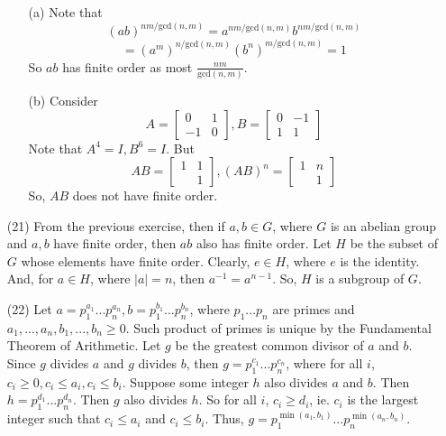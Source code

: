 \documentclass[12pt]{article}
\begin{document}
\begin{itemize}
\begin{itemize}
\item[(a)]
Note that 
$$(ab)^{nm/\text{gcd}(n,m)} = a^{nm/\text{gcd}(n,m)}b^{nm/\text{gcd}(n,m)}$$
$$= (a^m)^{n/\text{gcd}(n,m)}(b^n)^{m/\text{gcd}(n,m)} = 1$$ So $ab$ has finite order as most $\frac{nm}{\text{gcd}(n,m)}$. 
\item[(b)]
Consider
$$A = \begin{bmatrix}
0 & 1 \\
-1 & 0
\end{bmatrix}, B = \begin{bmatrix}
0 & -1 \\
1 & 1
\end{bmatrix}$$
Note that $A^4 = I, B^6 = I$. But
$$AB = \begin{bmatrix}
1 & 1 \\
& 1
\end{bmatrix}, (AB)^n = \begin{bmatrix}
1 & n \\
& 1
\end{bmatrix}$$
So, $AB$ does not have finite order.
\end{itemize}
\item[(21)]
From the previous exercise, then if $a, b \in G$, where $G$ is an abelian group and $a, b$ have finite order, then $ab$ also has finite order. Let $H$ be the subset of $G$ whose elements have finite order. Clearly, $e \in H$, where $e$ is the identity. And, for $a \in H$, where $|a| = n$, then $a^{-1} = a^{n-1}$. So, $H$ is a subgroup of $G$.
\item[(22)]
Let $a = p_1^{a_1}...p_n^{a_n}, b = p_1^{b_1}...p_n^{b_n}$, where $p_1...p_n$ are primes and $a_1, ..., a_n, b_1, ..., b_n \geq 0$. Such product of primes is unique by the Fundamental Theorem of Arithmetic. Let $g$ be the greatest common divisor of $a$ and $b$. Since $g$ divides $a$ and $g$ divides $b$, then $g = p_1^{c_1}...p_n^{c_n}$, where for all $i$, $c_i \geq 0, c_i \leq a_i, c_i \leq b_i$. Suppose some integer $h$ also divides $a$ and $b$. Then $h = p_1^{d_1}...p_n^{d_n}$. Then $g$ also divides $h$. So for all $i$, $c_i \geq d_i$, ie. $c_i$ is the largest integer such that $c_i \leq a_i$ and $c_i \leq b_i$. Thus, $g = p_1^{\min(a_1,b_1)}...p_n^{\min(a_n,b_n)}$.
\end{itemize}
\end{document}
